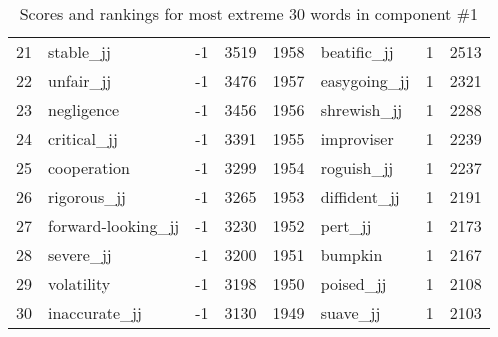 \begin{table}[tbp]
\begin{tabular}{| rlr@{.}l | rlr@{.}l |}
    21 & stable\_jj & -1 & 3519    &    1958 & beatific\_jj & 1 & 2513 \\
    22 & unfair\_jj & -1 & 3476    &    1957 & easygoing\_jj & 1 & 2321 \\
    23 & negligence & -1 & 3456    &    1956 & shrewish\_jj & 1 & 2288 \\
    24 & critical\_jj & -1 & 3391    &    1955 & improviser & 1 & 2239 \\
    25 & cooperation & -1 & 3299    &    1954 & roguish\_jj & 1 & 2237 \\
    26 & rigorous\_jj & -1 & 3265    &    1953 & diffident\_jj & 1 & 2191 \\
    27 & forward-looking\_jj & -1 & 3230    &    1952 & pert\_jj & 1 & 2173 \\
    28 & severe\_jj & -1 & 3200    &    1951 & bumpkin & 1 & 2167 \\
    29 & volatility & -1 & 3198    &    1950 & poised\_jj & 1 & 2108 \\
    30 & inaccurate\_jj & -1 & 3130    &    1949 & suave\_jj & 1 & 2103 \\
    \hline
    \end{tabular}
    \caption{Scores and rankings for most extreme 30 words in component \#1} 
\end{table}
\clearpage
